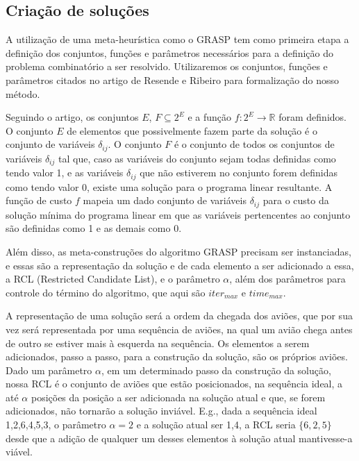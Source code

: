 \documentclass[a4paper,10pt]{abnt} %
\begin{document}
\subsection{Criação de soluções}

A utilização de uma meta-heurística como o GRASP tem como primeira etapa a definição dos conjuntos, funções e parâmetros necessários para a definição do problema combinatório a ser resolvido. Utilizaremos os conjuntos, funções e parâmetros citados no artigo de Resende e Ribeiro \cite{Resende02greedyrandomized} para formalização do nosso método.

Seguindo o artigo, os conjuntos $E$, $F \subseteq 2^{E}$ e a função $f : 2^{E} \rightarrow \mathbb{R}$ foram definidos. O conjunto $E$ de elementos que possivelmente fazem parte da solução é o conjunto de variáveis $\delta_{ij}$. O conjunto $F$ é o conjunto de todos os conjuntos de variáveis $\delta_{ij}$ tal que, caso as variáveis do conjunto sejam todas definidas como tendo valor 1, e as variáveis $\delta_{ij}$ que não estiverem no conjunto forem definidas como tendo valor 0, existe uma solução para o programa linear resultante. A função de custo $f$ mapeia um dado conjunto de variáveis $\delta_{ij}$ para o custo da solução mínima do programa linear em que as variáveis pertencentes ao conjunto são definidas como 1 e as demais como 0.

Além disso, as meta-construções do algoritmo GRASP precisam ser instanciadas, e essas são a representação da solução e de cada elemento a ser adicionado a essa, a RCL (Restricted Candidate List), e o parâmetro $\alpha$, além dos parâmetros para controle do término do algoritmo, que aqui são $iter_{max}$ e $time_{max}$.

A representação de uma solução será a ordem da chegada dos aviões, que por sua vez será representada por uma sequência de aviões, na qual um avião chega antes de outro se estiver mais à esquerda na sequência. Os elementos a serem adicionados, passo a passo, para a construção da solução, são os próprios aviões. Dado um parâmetro $\alpha$, em um determinado passo da construção da solução, nossa RCL é o conjunto de aviões que estão posicionados,  na sequência ideal, a até $\alpha$ posições da posição a ser adicionada na solução atual e que, se forem adicionados, não tornarão a solução inviável. E.g., dada a sequência ideal 1,2,6,4,5,3, o parâmetro $\alpha = 2$ e a solução atual ser 1,4, a RCL seria $\{6,2,5\}$ desde que a adição de qualquer um desses elementos à solução atual mantivesse-a viável.
\end{document}
